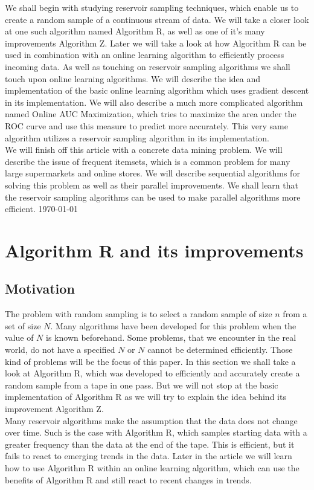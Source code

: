 \documentclass[journal]{IEEEtran/IEEEtran}
\begin{document}
We shall begin with studying reservoir sampling techniques, which enable us to create a random sample of a continuous stream of data. We will take a closer look at one such algorithm named Algorithm R, as well as one of it's many improvements Algorithm Z. Later we will take a look at how Algorithm R can be used in combination with an online learning algorithm to efficiently process incoming data. As well as touching on reservoir sampling algorithms we shall touch upon online learning algorithms. We will describe the idea and implementation of the basic online learning algorithm which uses gradient descent in its implementation. We will also describe a much more complicated algorithm named Online AUC Maximization, which tries to maximize the area under the ROC curve and use this measure to predict more accurately. This very same algorithm utilizes a reservoir sampling algorithm in its implementation.\\

We will finish off this article with a concrete data mining problem. We will describe the issue of frequent itemsets, which is a common problem for many large supermarkets and online stores. We will describe sequential algorithms for solving this problem as well as their parallel improvements. We shall learn that the reservoir sampling algorithms can be used to make parallel algorithms more efficient.
\hfill \today
\section{Algorithm R and its improvements}
\subsection{Motivation}
The problem with random sampling is to select a random sample of size $n$ from a set of size $N$. Many algorithms have been developed for this problem when the value of $N$ is known beforehand. Some problems, that we encounter in the real world, do not have a specified $N$ or $N$ cannot be determined efficiently. Those kind of problems will be the focus of this paper. In this section we shall take a look at Algorithm R, which was developed to efficiently and accurately create a random sample from a tape in one pass. But we will not stop at the basic implementation of Algorithm R as we will try to explain the idea behind its improvement Algorithm Z.\\

Many reservoir algorithms make the assumption that the data does not change over time. Such is the case with Algorithm R, which samples starting data with a greater frequency than the data at the end of the tape. This is efficient, but it fails to react to emerging trends in the data. Later in the article we will learn how to use Algorithm R within an online learning algorithm, which can use the benefits of Algorithm R and still react to recent changes in trends. 
\end{document}
